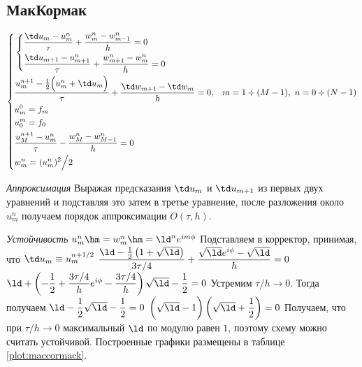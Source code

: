 \documentclass[a4paper,12pt]{article}
\begin{document}
\subsection{МакКормак}
\label{sec:maccormack}
  \begin{equation}
    \left\{
    \begin{aligned}
      &
        \left\{
        \begin{aligned}
          &\frac{\td u_{m} - u_m^n}{\tau} + \frac{w_{m}^n - w_{m-1}^n}{h} = 0\\
          &\frac{\td u_{m+1} - u_{m+1}^n}{\tau} + \frac{w_{m+1}^n - w_{m}^n}{h} = 0\\
        \end{aligned}
        \right. & &{}\\
      &\frac{u_m^{n+1} - \frac{1}{2} \Bigl(u_{m}^n + \td u_m\Bigr)}{\tau} +
        \frac{\td w_{m+1} - \td w_{m}}{h} = 0, &
        &m = 1 \div (M-1),\ n = 0 \div (N-1)\\
      &u_m^0 = f_m & &{}\\
      &u_0^m = f_0 & &{}\\
      &\frac{u_M^{n+1} - u_m^n}{\tau} - \frac{w_M^n - w_{M-1}^n}{h} = 0 & &{}\\
      &w_m^n = (u_m^n)^2 \Big/ 2 & &{}
    \end{aligned}
    \right.
    \label{eq:maccormack}
  \end{equation}
  
  \jp
  \emph{Аппроксимация}
  \jp
  Выражая предсказания $\td u_m$ и $\td u_{m+1}$ из первых двух уравнений и подставляя это затем в третье уравнение, после разложения около $u_m^n$ получаем порядок аппроксимации $O(\tau, h)$.
  
  \jp
  \emph{Устойчивость}
  \jp
  $u_m^n \hm= w_m^n \hm= \ld^n e^{im\phi}$\jp
  Подставляем в корректор, принимая, что $\td u_m \equiv u_m^{n+1/2}$\jp
  $\dfrac{\ld - \frac{1}{2}\left(\vphantom{\frac{1}{2}}1 + \sqrt{\ld}\right)}{3\tau/4} +
    \dfrac{\sqrt{\ld}e^{i\phi} - \sqrt{\ld}}{h} = 0$\jp
  $\ld + \left(-\dfrac{1}{2} + \dfrac{3\tau/4}{h}e^{i\phi} - \dfrac{3\tau/4}{h}\right)\sqrt{\ld} - \dfrac{1}{2} = 0$\jp
  Устремим $\tau \Big/ h \to 0$.
  Тогда получаем\jp
  $\ld - \dfrac{1}{2} \sqrt{\ld} - \dfrac{1}{2} = 0$\jp
  $\left(\vphantom{\dfrac{1}{2}}\sqrt{\ld} - 1\right)\left(\sqrt{\ld} + \dfrac{1}{2}\right) = 0$\jp
  Получаем, что при $\tau \Big/ h \to 0$ максимальный $\ld$ по модулю равен $1$, поэтому схему можно считать устойчивой.
  \jp
  Построенные графики размещены в таблице \ref{plot:maccormack}.
  \newpage
\end{document}
